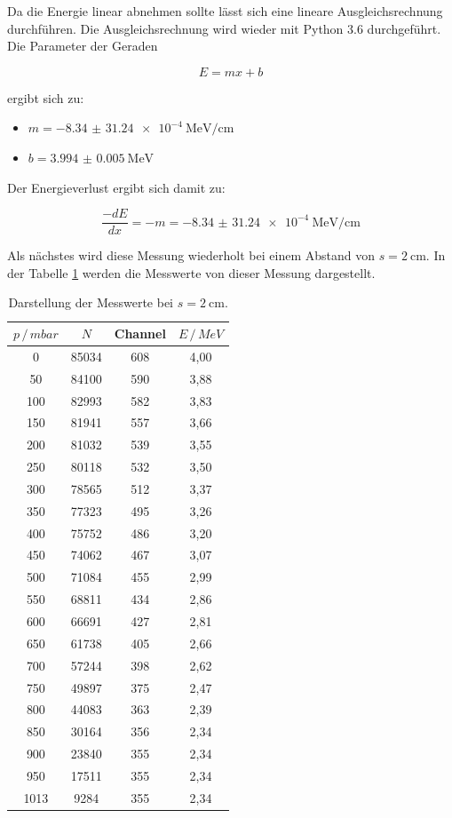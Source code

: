 Da die Energie linear abnehmen sollte lässt sich eine lineare Ausgleichsrechnung
durchführen. Die Ausgleichsrechnung wird wieder mit Python 3.6 durchgeführt.
Die Parameter der Geraden

\begin{equation*}
  E = mx + b
\end{equation*}

ergibt sich zu:

\begin{itemize}
  \item $m = \SI{-8.34(3124)e-4}{\mega\eV\per\centi\meter}$
  \item $b = \SI{3.994(5)}{\mega\eV}$
\end{itemize}

Der Energieverlust ergibt sich damit zu:

\begin{equation*}
  \frac{-dE}{dx} = -m = \SI{-8.34(3124)e-4}{\mega\eV\per\centi\meter}
\end{equation*}

Als nächstes wird diese Messung wiederholt bei einem Abstand von $s = \SI{2}{\centi\meter}$.
In der Tabelle \ref{tab:2} werden die Messwerte von dieser Messung dargestellt.

\begin{table}[H]
  \centering
  \caption{Darstellung der Messwerte bei $s = \SI{2}{\centi\meter}$.}
  \label{tab:2}
  \begin{tabular}{c c c c}
    \toprule
    $p \, / \, mbar$ & $N$ & Channel & $E \, / \, MeV$ \\
    \midrule
    0  & 85034& 608  & 4,00\\
    50 & 84100& 590  & 3,88\\
    100& 82993& 582  & 3,83\\
    150& 81941& 557  & 3,66\\
    200& 81032& 539  & 3,55\\
    250& 80118& 532  & 3,50\\
    300& 78565& 512  & 3,37\\
    350& 77323& 495  & 3,26\\
    400& 75752& 486  & 3,20\\
    450& 74062& 467  & 3,07\\
    500& 71084& 455  & 2,99\\
    550& 68811& 434  & 2,86\\
    600& 66691& 427  & 2,81\\
    650& 61738& 405  & 2,66\\
    700& 57244& 398  & 2,62\\
    750& 49897& 375  & 2,47\\
    800& 44083& 363  & 2,39\\
    850& 30164& 356  & 2,34\\
    900& 23840& 355  & 2,34\\
    950& 17511& 355  & 2,34\\
   1013 &  9284& 355 &  2,34\\
    \bottomrule
  \end{tabular}
\end{table}

